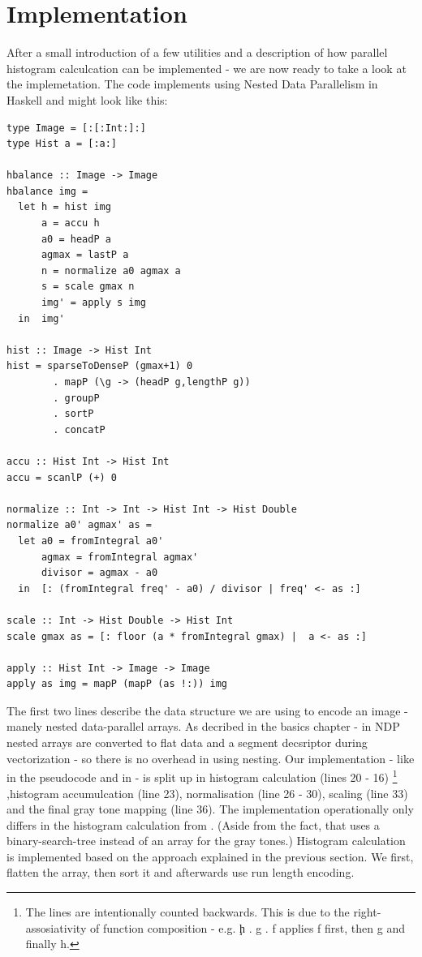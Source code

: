\section{Implementation}
  After a small introduction of a few utilities and a description of how
  parallel histogram calculcation can be implemented - we are now ready to
  take a look at the implemetation. The code
  implements \algo using Nested Data Parallelism in Haskell and
  might look like this:
  \begin{lstlisting}
type Image = [:[:Int:]:]
type Hist a = [:a:]

hbalance :: Image -> Image
hbalance img =
  let h = hist img
      a = accu h
      a0 = headP a
      agmax = lastP a
      n = normalize a0 agmax a
      s = scale gmax n
      img' = apply s img
  in  img'

hist :: Image -> Hist Int
hist = sparseToDenseP (gmax+1) 0
        . mapP (\g -> (headP g,lengthP g))
        . groupP
        . sortP
        . concatP

accu :: Hist Int -> Hist Int
accu = scanlP (+) 0

normalize :: Int -> Int -> Hist Int -> Hist Double
normalize a0' agmax' as =
  let a0 = fromIntegral a0'
      agmax = fromIntegral agmax'
      divisor = agmax - a0
  in  [: (fromIntegral freq' - a0) / divisor | freq' <- as :]

scale :: Int -> Hist Double -> Hist Int
scale gmax as = [: floor (a * fromIntegral gmax) |  a <- as :]

apply :: Hist Int -> Image -> Image
apply as img = mapP (mapP (as !:)) img
  \end{lstlisting}
  The first two lines describe the data structure we are using to encode an image - 
  manely nested data-parallel arrays.
  As decribed in the basics chapter - in NDP
  nested arrays are converted to flat data and a segment decsriptor
  during vectorization - so there is no overhead in using nesting.
  Our implementation - like in the pseudocode and in \seq - 
  is split up in histogram calculation (lines 20 - 16)
  \footnote{The lines are intentionally counted backwards. This is due to the right-assosiativity of function composition - e.g. \c{h . g . f} applies f first, then g and finally h.}
  ,histogram accumulcation (line 23), normalisation (line 26 - 30),
  scaling (line 33) and the final gray tone mapping (line 36).
  The implementation operationally only differs in the histogram calculation from \seq.
  (Aside from the fact, that \seq uses a binary-search-tree instead of an array
  for the gray tones.)
  Histogram calculation is implemented based on the approach explained in the
  previous section. We first, flatten the array, then sort it and afterwards
  use run length encoding.
  
